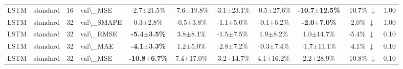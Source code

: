 \begin{table}[t]
\begin{tabular}{l l r l c c c c c c c}
LSTM & standard & 16 & val\textbackslash{}_MSE & -2.7$\pm$21.5\% & -7.6$\pm$19.8\% & -3.1$\pm$23.1\% & -0.5$\pm$27.6\% & \textbf{-10.7$\pm$12.5\%} & -10.7\% $\downarrow$ & 1.00 \\
LSTM & standard & 32 & val\textbackslash{}_SMAPE & 0.3$\pm$2.8\% & -0.5$\pm$3.8\% & -1.1$\pm$5.0\% & -0.1$\pm$6.2\% & \textbf{-2.0$\pm$7.0\%} & -2.0\% $\downarrow$ & 1.00 \\
LSTM & standard & 32 & val\textbackslash{}_RMSE & \textbf{-5.4$\pm$3.5\%} & 3.8$\pm$8.1\% & -1.5$\pm$7.5\% & 1.9$\pm$8.2\% & 1.0$\pm$14.7\% & -5.4\% $\downarrow$ & 0.10 \\
LSTM & standard & 32 & val\textbackslash{}_MAE & \textbf{-4.1$\pm$3.3\%} & 1.2$\pm$5.0\% & -2.8$\pm$7.2\% & -0.3$\pm$7.4\% & -1.7$\pm$11.1\% & -4.1\% $\downarrow$ & 0.10 \\
LSTM & standard & 32 & val\textbackslash{}_MSE & \textbf{-10.8$\pm$6.7\%} & 7.4$\pm$17.0\% & -3.2$\pm$14.7\% & 4.1$\pm$16.2\% & 2.2$\pm$28.9\% & -10.8\% $\downarrow$ & 0.10 \\
\bottomrule
\end{tabular}
\end{table}